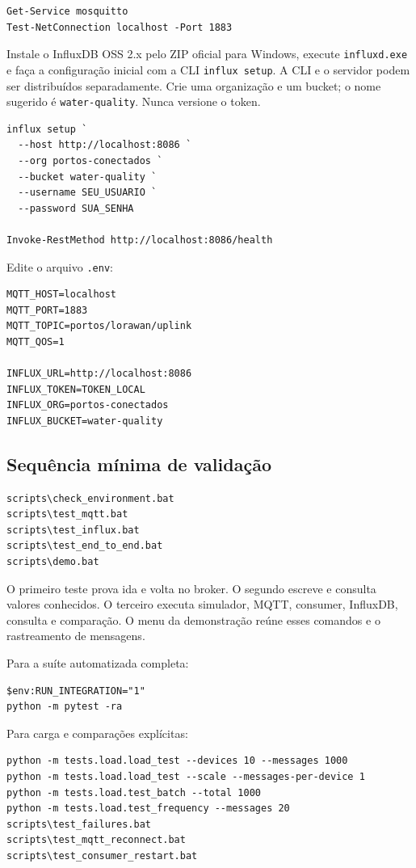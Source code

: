 \documentclass[12pt,a4paper]{article}
\newcommand{\code}[1]{\texttt{#1}}
\begin{document}
\begin{lstlisting}
Get-Service mosquitto
Test-NetConnection localhost -Port 1883
\end{lstlisting}

Instale o InfluxDB OSS 2.x pelo ZIP oficial para Windows, execute \code{influxd.exe} e faça a configuração inicial com a CLI \code{influx setup}. A CLI e o servidor podem ser distribuídos separadamente. Crie uma organização e um bucket; o nome sugerido é \code{water-quality}. Nunca versione o token.

\begin{lstlisting}
influx setup `
  --host http://localhost:8086 `
  --org portos-conectados `
  --bucket water-quality `
  --username SEU_USUARIO `
  --password SUA_SENHA

Invoke-RestMethod http://localhost:8086/health
\end{lstlisting}

Edite o arquivo \code{.env}:

\begin{lstlisting}
MQTT_HOST=localhost
MQTT_PORT=1883
MQTT_TOPIC=portos/lorawan/uplink
MQTT_QOS=1

INFLUX_URL=http://localhost:8086
INFLUX_TOKEN=TOKEN_LOCAL
INFLUX_ORG=portos-conectados
INFLUX_BUCKET=water-quality
\end{lstlisting}

\subsection{Sequência mínima de validação}

\begin{lstlisting}
scripts\check_environment.bat
scripts\test_mqtt.bat
scripts\test_influx.bat
scripts\test_end_to_end.bat
scripts\demo.bat
\end{lstlisting}

O primeiro teste prova ida e volta no broker. O segundo escreve e consulta valores conhecidos. O terceiro executa simulador, MQTT, consumer, InfluxDB, consulta e comparação. O menu da demonstração reúne esses comandos e o rastreamento de mensagens.

Para a suíte automatizada completa:

\begin{lstlisting}
$env:RUN_INTEGRATION="1"
python -m pytest -ra
\end{lstlisting}

Para carga e comparações explícitas:

\begin{lstlisting}
python -m tests.load.load_test --devices 10 --messages 1000
python -m tests.load.load_test --scale --messages-per-device 1
python -m tests.load.test_batch --total 1000
python -m tests.load.test_frequency --messages 20
scripts\test_failures.bat
scripts\test_mqtt_reconnect.bat
scripts\test_consumer_restart.bat
\end{lstlisting}
\end{document}
